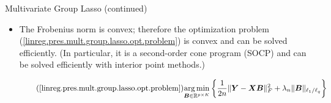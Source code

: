 \documentclass[notes]{beamer}       %
\begin{document}

\begin{frame}{Multivariate Group Lasso (continued)}{}
  \begin{itemize}
  \item{The Frobenius norm is convex; therefore the optimization problem (\ref{linreg.pres.mult.group.lasso.opt.problem}) is convex and can be solved efficiently. (In particular, it is a second-order cone program (SOCP) and can be solved efficiently with interior point methods.)
  
  \begin{equation}\tag{\ref{linreg.pres.mult.group.lasso.opt.problem}}
   \underset{\boldsymbol{B} \in \mathbb{R}^{p \times K}} {\arg \min}\left\{  \frac{1}{2n} \lVert \boldsymbol{Y} - \boldsymbol{X} \boldsymbol{B} \rVert_F^2 + \lambda_n \lVert \boldsymbol{B} \rVert _{\ell_1/\ell_q}\right\}
   \end{equation}
  }

  \end{itemize}
\end{frame}
\end{document}
